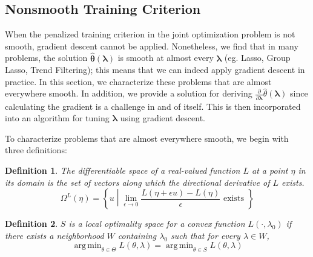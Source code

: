 \documentclass[10pt,letterpaper]{article}
\newtheorem{definition}{Definition}
\DeclareMathOperator*{\argmin}{arg\,min}
\begin{document}
\subsection{Nonsmooth Training Criterion}
When the penalized training criterion in the joint optimization problem is not smooth, gradient descent cannot be applied. Nonetheless, we find that in many problems, the solution $\hat{\boldsymbol \theta}\left(\boldsymbol{\lambda}\right)$ is smooth at almost every $\boldsymbol{\lambda}$ (eg. Lasso, Group Lasso, Trend Filtering); this means that we can indeed apply gradient descent in practice. In this section, we characterize these problems that are almost everywhere smooth. In addition, we provide a solution for deriving $\frac{\partial}{\partial \boldsymbol{\lambda}} \hat{\theta}(\boldsymbol{\lambda})$ since calculating the gradient is a challenge in and of itself. This is then incorporated into an algorithm for tuning $\boldsymbol{\lambda}$ using gradient descent.

\vspace{2mm}
To characterize problems that are almost everywhere smooth, we begin with three definitions:
\begin{definition}
The differentiable space of a real-valued function $L$ at a point $\eta$ in its domain is the set of vectors along which the directional derivative of $L$ exists.
\begin{equation}
\Omega^{L}(\eta) = \left \{ u \middle | \lim_{\epsilon \rightarrow 0} \frac{L(\eta + \epsilon u) - L(\eta)}{\epsilon} \text{ exists } \right \}
\end{equation}
\end{definition}

\begin{definition}
$S$ is a local optimality space for a convex function $L(\cdot, \lambda_0)$ if there exists a neighborhood $W$ containing $\lambda_0$ such that for every $\lambda \in W$,
\begin{equation}
\argmin_{\theta \in \Theta} L(\theta, \lambda) = \argmin_{\theta \in S} L(\theta, \lambda)
\end{equation}
\end{definition}
\end{document}
